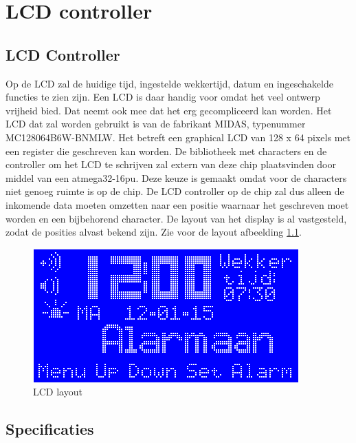 \chapter{LCD controller}
\section{LCD Controller}
Op de LCD zal de huidige tijd, ingestelde wekkertijd, datum en ingeschakelde functies te zien zijn. Een LCD is daar handig voor omdat het veel ontwerp vrijheid bied. Dat neemt ook mee dat het erg gecompliceerd kan worden. Het LCD dat zal worden gebruikt is van de fabrikant MIDAS, typenummer MC128064B6W-BNMLW. Het betreft een graphical LCD van 128 x 64 pixels met een register die geschreven kan worden. De bibliotheek met characters en de controller om het LCD te schrijven zal extern van deze chip plaatsvinden door middel van een atmega32-16pu. Deze keuze is gemaakt omdat voor de characters niet genoeg ruimte is op de chip. De LCD controller op de chip zal dus alleen de inkomende data moeten omzetten naar een positie waarnaar het geschreven moet worden en een bijbehorend character. De layout van het display is al vastgesteld, zodat de posities alvast bekend zijn.  Zie voor de layout afbeelding \ref{fig:lcdlayout}.  \\

\begin{figure}
  \centering
     \includegraphics[angle = 0, scale= 1]{Figuren/LCD/voorbeeld_lcd.png}
       \caption{LCD layout}
\label{fig:lcdlayout}
\end{figure}

\section{Specificaties}

